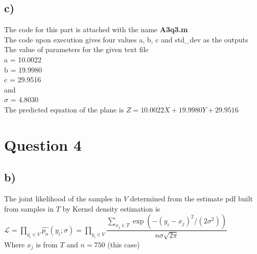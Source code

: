 \documentclass{article}
\begin{document}
\subsection*{c)}
The code for this part is attached with the name \textsf{\textbf{{\sf A3q3.m}}}\\
The code upon execution gives four values a, b, c and std\_dev as the outputs\\
The value of parameters for the given text file \\
a = 10.0022\\
b = 19.9980\\
c = 29.9516\\
and \\
$\sigma $ = 4.8030 \\
The predicted equation of the plane is $Z = 10.0022X+19.9980Y+29.9516$
\section*{Question 4}
\subsection*{b)}
The joint likelihood of the samples in $V$ determined from the estimate pdf built from samples in $T$ by Kernel density estimation is\\
$\mathcal{L} = \prod_{y_i \in V} \hat{p_n}(y_i;\sigma) = \prod_{y_i \in V}\dfrac{\sum_{x_j \in T} \exp{(-(y_i - x_j)^2/(2 \sigma^2))}}{n \sigma \sqrt{2 \pi}}$\\
Where $x_j$ is from $T$ and $n = 750 $ (this case)
\end{document}
